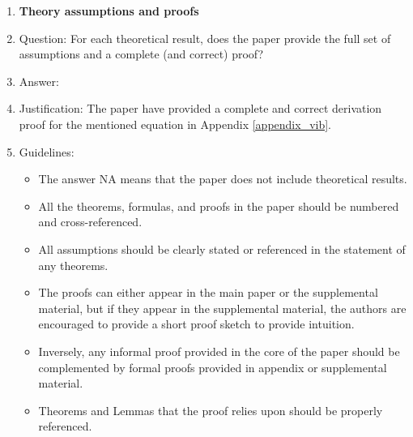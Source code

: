 \documentclass{article}
\begin{document}
\begin{enumerate}
\item {\bf Theory assumptions and proofs}
    \item[] Question: For each theoretical result, does the paper provide the full set of assumptions and a complete (and correct) proof?
    \item[] Answer: \answerYes{} %
    \item[] Justification: The paper have provided a complete and correct derivation proof for the mentioned equation in Appendix \ref{appendix_vib}.
    \item[] Guidelines:
    \begin{itemize}
        \item The answer NA means that the paper does not include theoretical results. 
        \item All the theorems, formulas, and proofs in the paper should be numbered and cross-referenced.
        \item All assumptions should be clearly stated or referenced in the statement of any theorems.
        \item The proofs can either appear in the main paper or the supplemental material, but if they appear in the supplemental material, the authors are encouraged to provide a short proof sketch to provide intuition. 
        \item Inversely, any informal proof provided in the core of the paper should be complemented by formal proofs provided in appendix or supplemental material.
        \item Theorems and Lemmas that the proof relies upon should be properly referenced. 
    \end{itemize}


\end{enumerate}
\end{document}
